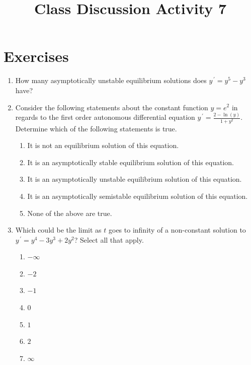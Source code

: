 \documentclass{ximera}
\begin{document}
\begin{abstract}
 \end{abstract}

    \title{Class Discussion Activity 7}
    
    \maketitle

\section*{Exercises}

\begin{enumerate}[label=(\arabic*)]

\item How many asymptotically unstable equilibrium solutions does $y^{\,\prime}=y^5-y^3$ have?


\item Consider the following statements about the constant function $\displaystyle y=e^2$ in regards to the first order autonomous differential equation $\displaystyle y^{\,\prime}=\frac{2-\ln{(y)}}{1+y^2}$.  Determine which of the following statements is true.



\begin{enumerate}[label=(\alph*)]
\item It is not an equilibrium solution of this equation.
\item It is an asymptotically stable equilibrium solution of this equation. %
\item It is an asymptotically unstable equilibrium solution of this equation.  
\item It is an asymptotically semistable equilibrium solution of this equation.
\item None of the above are true.
\end{enumerate}



\item Which could be the limit as $t$ goes to infinity of a non-constant solution to $y^{\,\prime}=y^4-3y^3+2y^2$?  Select all that apply.
    
\begin{enumerate}[label=(\alph*)]
		\item $-\infty$   
        \item $-2$
        \item $-1$
		\item $0$ %
		\item $1$ %
 		\item $2$ 
		\item $\infty$ %
\end{enumerate}


\end{enumerate}
\end{document}
